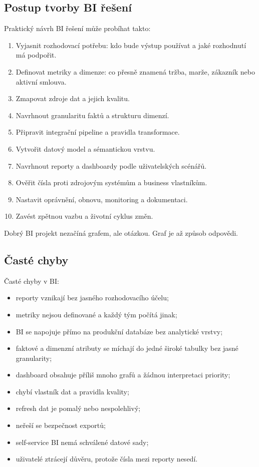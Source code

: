 \subsection{Postup tvorby BI řešení}
Praktický návrh BI řešení může probíhat takto:
\begin{enumerate}
  \item Vyjasnit rozhodovací potřebu: kdo bude výstup používat a jaké rozhodnutí má podpořit.
  \item Definovat metriky a dimenze: co přesně znamená tržba, marže, zákazník nebo aktivní smlouva.
  \item Zmapovat zdroje dat a jejich kvalitu.
  \item Navrhnout granularitu faktů a strukturu dimenzí.
  \item Připravit integrační pipeline a pravidla transformace.
  \item Vytvořit datový model a sémantickou vrstvu.
  \item Navrhnout reporty a dashboardy podle uživatelských scénářů.
  \item Ověřit čísla proti zdrojovým systémům a business vlastníkům.
  \item Nastavit oprávnění, obnovu, monitoring a dokumentaci.
  \item Zavést zpětnou vazbu a životní cyklus změn.
\end{enumerate}

Dobrý BI projekt nezačíná grafem, ale otázkou. Graf je až způsob odpovědi.

\subsection{Časté chyby}
Časté chyby v BI:
\begin{itemize}
  \item reporty vznikají bez jasného rozhodovacího účelu;
  \item metriky nejsou definované a každý tým počítá jinak;
  \item BI se napojuje přímo na produkční databáze bez analytické vrstvy;
  \item faktové a dimenzní atributy se míchají do jedné široké tabulky bez jasné granularity;
  \item dashboard obsahuje příliš mnoho grafů a žádnou interpretaci priority;
  \item chybí vlastník dat a pravidla kvality;
  \item refresh dat je pomalý nebo nespolehlivý;
  \item neřeší se bezpečnost exportů;
  \item self-service BI nemá schválené datové sady;
  \item uživatelé ztrácejí důvěru, protože čísla mezi reporty nesedí.
\end{itemize}

